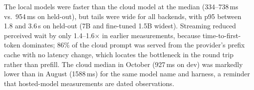 The local models were faster than the cloud model at the median (334--738\,ms
vs.\ 954\,ms on held-out), but tails were wide for all backends, with p95
between 1.8 and 3.6\,s on held-out (7B and fine-tuned 1.5B widest).
Streaming reduced perceived wait by only 1.4--1.6$\times$ in earlier
measurements, because time-to-first-token dominates; 86\% of the cloud
prompt was served from the provider's prefix cache with no latency change,
which locates the bottleneck in the round trip rather than prefill. The cloud
median in October (927\,ms on dev) was markedly lower than in August
(1588\,ms) for the same model name and harness, a reminder that hosted-model
measurements are dated observations.
